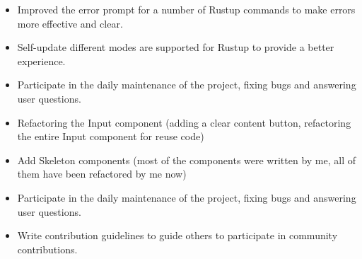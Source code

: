 \documentclass{resume}
\newcommand{\en}[1]{#1}
\newcommand{\zh}[1]{}
\begin{document}
\en{}
\zh{\role{维护者}{\href{https://github.com/rust-lang/rustup/commits?author=hi-rustin}{57+ 个提交}}}
\begin{itemize}
      \item \en{Improved the error prompt for a number of Rustup commands to make errors more effective and clear.}
            \zh{改善了大量 Rustup 命令的错误提示，让错误更有效更清晰。}
      \item \en{Self-update different modes are supported for Rustup to provide a better experience.}
            \zh{为 Rustup 支持了 self-update 不同模式来提供更好的使用体验。}
      \item \en{Participate in the daily maintenance of the project, fixing bugs and answering user questions.}
            \zh{参与项目日常维护，修复 bug 和回答用户问题。}
\end{itemize}

\en{}
\zh{\role{维护者}{\href{https://github.com/ant-design/ant-design/commits?author=hi-rustin}{24+ 个提交}}}
\begin{itemize}
      \item \en{Refactoring the Input component (adding a clear content button, refactoring the entire Input component for reuse code)}
            \zh{重构 Input 组件（添加一个清除内容按钮，为了复用代码重构整个 Input 组件）}
      \item \en{Add Skeleton components (most of the components were written by me, all of them have been refactored by me now)}
            \zh{添加 Skeleton 组件（大部分组件由我编写，目前所有组件已被我重构）}
      \item \en{Participate in the daily maintenance of the project, fixing bugs and answering user questions.}
            \zh{参与项目日常维护，修复 bug 和回答用户问题。}
      \item \en{Write contribution guidelines to guide others to participate in community contributions.}
            \zh{编写贡献指南，引导其他人参与社区贡献。}
\end{itemize}
\end{document}
